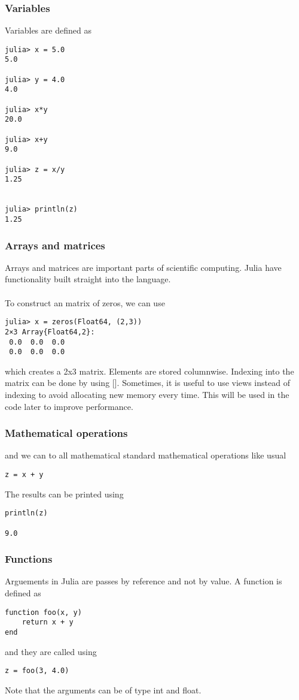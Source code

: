 \subsubsection{Variables}
Variables are defined as
\begin{lstlisting}
julia> x = 5.0
5.0

julia> y = 4.0
4.0

julia> x*y
20.0

julia> x+y
9.0

julia> z = x/y
1.25


julia> println(z)
1.25
\end{lstlisting}
\subsubsection{Arrays and matrices}
Arrays and matrices are important parts of scientific computing. Julia have functionality built straight into the language.
\\
\\
To construct an matrix of zeros, we can use
\begin{lstlisting}
julia> x = zeros(Float64, (2,3))
2×3 Array{Float64,2}:
 0.0  0.0  0.0
 0.0  0.0  0.0
\end{lstlisting}
which creates a 2x3 matrix. Elements are stored columnwise. Indexing into the matrix can be done by using []. Sometimes, it is useful to use views instead of indexing to avoid allocating new memory every time. This will be used in the code later to improve performance. 
\subsubsection{Mathematical operations}
and we can to all mathematical standard mathematical operations like usual
\begin{lstlisting}
z = x + y
\end{lstlisting}
The results can be printed using
\begin{lstlisting}
println(z)

9.0
\end{lstlisting}
\subsubsection{Functions}
Arguements in Julia are passes by reference and not by value. 
A function is defined as
\begin{lstlisting}
function foo(x, y)
    return x + y
end
\end{lstlisting}
and they are called using
\begin{lstlisting}
z = foo(3, 4.0)
\end{lstlisting}
Note that the arguments can be of type int and float.
